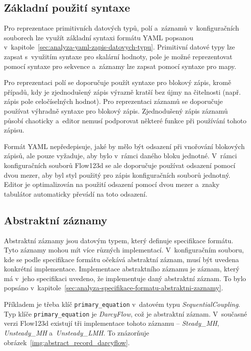 \documentclass[FM,bw,DP]{tulthesis}
\begin{document}
\subsection{Základní použití syntaxe}

Pro reprezentace primitivních datových typů, polí a~záznamů v~konfiguračních souborech lze využít základní syntaxi formátu \gls{YAML} popsanou v~kapitole~\ref{sec:analyza-yaml-zapis-datovych-typu}. Primitivní datové typy lze zapsat s~využitím syntaxe pro skalární hodnoty, pole je možné reprezentovat pomocí syntaxe pro sekvence a~záznamy lze zapsat pomocí syntaxe pro mapy.

Pro reprezentaci polí se doporučuje použít syntaxe pro blokový zápis, kromě případů, kdy je zjednodušený zápis výrazně kratší bez újmy na čitelnosti (např. zápis pole celočíselných hodnot). Pro reprezentaci záznamů se doporučuje používat výhradně syntaxe pro blokový zápis. Zjednodušený zápis záznamů působí chaoticky a~editor nemusí podporovat některé funkce při používání tohoto zápisu.

Formát \gls{YAML} nepředepisuje, jaké by mělo být odsazení při vnořování blokových zápisů, ale pouze vyžaduje, aby bylo v~rámci daného bloku jednotné. V~rámci konfiguračních souborů Flow123d se ale doporučuje používat odsazení pomocí dvou mezer, aby byl styl použitý pro zápis konfiguračních souborů jednotný. Editor je optimalizován na použití odsazení pomocí dvou mezer a~znaky tabulátor automaticky převádí na toto odsazení.

\subsection{Abstraktní záznamy}
\label{sec:navrh-yaml-abstrakni-zaznamy}
Abstraktní záznamy jsou datovým typem, který definuje specifikace formátu. Tyto záznamy mohou mít více různých implementací. V~konfiguračním souboru, kde se podle specifikace formátu očekává abstraktní záznam, musí být uvedena konkrétní implementace. Implementace abstraktního záznamu je záznam, který má v~jeho specifikaci uvedeno, že implementuje daný abstraktní záznam. To bylo popsáno v~kapitole~\ref{sec:analyza-specifikace-formatu-abstraktni-zaznamy}.

Příkladem je třeba klíč \texttt{primary\_equation} v~datovém typu \textit{SequentialCoupling}. Typ klíče \texttt{primary\_equation} je \textit{DarcyFlow}, což je abstraktní záznam. V~současné verzi Flow123d existují tři implementace tohoto záznamu -- \textit{Steady\_MH}, \textit{Unsteady\_MH} a~\textit{Unsteady\_LMH}. To znázorňuje obrázek~\ref{img:abstract_record_darcyflow}.
\end{document}
